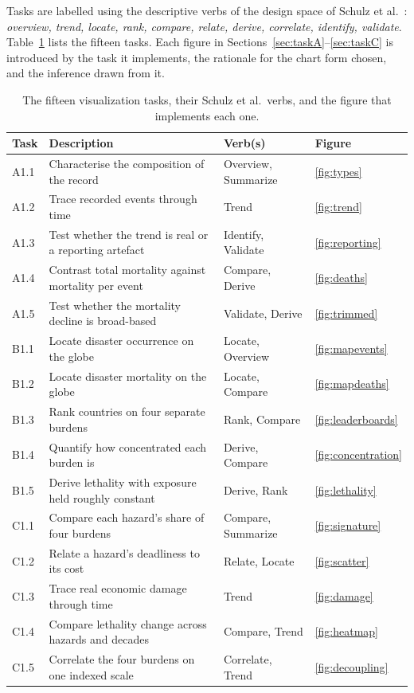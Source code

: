 \documentclass[11pt,a4paper]{article}
\begin{document}
Tasks are labelled using the descriptive verbs of the design space of Schulz et
al.~\cite{schulz2013}: \emph{overview, trend, locate, rank, compare, relate,
derive, correlate, identify, validate}. Table~\ref{tab:tasks} lists the fifteen
tasks. Each figure in Sections~\ref{sec:taskA}--\ref{sec:taskC} is introduced by
the task it implements, the rationale for the chart form chosen, and the
inference drawn from it.

\begin{table}[H]
\centering
\caption{The fifteen visualization tasks, their Schulz et al.\ verbs, and the
figure that implements each one.}
\label{tab:tasks}
\small
\begin{tabularx}{\linewidth}{@{}>{\raggedright\arraybackslash}p{1.4cm} X
                               >{\raggedright\arraybackslash}p{3.5cm}
                               >{\raggedright\arraybackslash}p{1.6cm}@{}}
\toprule
\textbf{Task} & \textbf{Description} & \textbf{Verb(s)} & \textbf{Figure}\\
\midrule
A1.1 & Characterise the composition of the record & Overview, Summarize & \ref{fig:types}\\
A1.2 & Trace recorded events through time & Trend & \ref{fig:trend}\\
A1.3 & Test whether the trend is real or a reporting artefact & Identify, Validate & \ref{fig:reporting}\\
A1.4 & Contrast total mortality against mortality per event & Compare, Derive & \ref{fig:deaths}\\
A1.5 & Test whether the mortality decline is broad-based & Validate, Derive & \ref{fig:trimmed}\\
\addlinespace
B1.1 & Locate disaster occurrence on the globe & Locate, Overview & \ref{fig:mapevents}\\
B1.2 & Locate disaster mortality on the globe & Locate, Compare & \ref{fig:mapdeaths}\\
B1.3 & Rank countries on four separate burdens & Rank, Compare & \ref{fig:leaderboards}\\
B1.4 & Quantify how concentrated each burden is & Derive, Compare & \ref{fig:concentration}\\
B1.5 & Derive lethality with exposure held roughly constant & Derive, Rank & \ref{fig:lethality}\\
\addlinespace
C1.1 & Compare each hazard's share of four burdens & Compare, Summarize & \ref{fig:signature}\\
C1.2 & Relate a hazard's deadliness to its cost & Relate, Locate & \ref{fig:scatter}\\
C1.3 & Trace real economic damage through time & Trend & \ref{fig:damage}\\
C1.4 & Compare lethality change across hazards and decades & Compare, Trend & \ref{fig:heatmap}\\
C1.5 & Correlate the four burdens on one indexed scale & Correlate, Trend & \ref{fig:decoupling}\\
\bottomrule
\end{tabularx}
\end{table}
\end{document}
